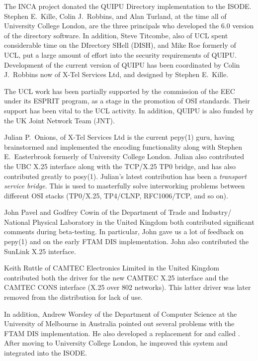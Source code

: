 The INCA project donated the QUIPU Directory implementation to the ISODE.
Stephen E.~Kille,
Colin J.~Robbins,
and Alan Turland,
at the time all of University College London,
are the three principals who developed the 6.0 version of the
directory software.
In addition,
Steve Titcombe,
also of UCL
spent considerable time on the DIrectory SHell (DISH), and 
Mike Roe formerly of UCL,
put a large amount of effort into the security requirements of QUIPU.
Development of the current version of QUIPU has been coordinated by 
Colin J.~Robbins now of X-Tel Services Ltd, and designed by
Stephen E.~Kille.

The UCL work has been partially supported by the commission of the
EEC under its ESPRIT program,
as a stage in the promotion of OSI standards.
Their support has been vital to the UCL activity.
In addition,
QUIPU is also funded by the UK Joint Network Team (JNT).

Julian P.~Onions,
of X-Tel Services Ltd
is the current \man pepy(1) guru,
having brainstormed and implemented the encoding functionality along with
Stephen E.~Easterbrook
formerly of University College London.
Julian also contributed the UBC X.25 interface 
along with the TCP/X.25 TP0 bridge,
and has also contributed greatly to \man posy(1).
Julian's latest contribution has been a {\em transport service bridge}.
This is used to masterfully solve interworking problems between different OSI
stacks (TP0/X.25, TP4/CLNP, RFC1006/TCP, and so on).

John Pavel
and Godfrey Cowin
of the Department of Trade and Industry/ National Physical Laboratory in the
United Kingdom
both contributed significant comments during beta-testing.
In particular, John gave us a lot of feedback on \man pepy(1)
and on the early FTAM DIS implementation.
John also contributed the SunLink X.25 interface.

Keith Ruttle of CAMTEC Electronics Limited in the United
Kingdom contributed both the driver for the new CAMTEC X.25 interface and
the CAMTEC CONS interface (X.25 over 802 networks).
This latter driver was later removed from the distribution for lack of use.

In addition,
Andrew Worsley
of the Department of Computer Science at the University of Melbourne in
Australia
pointed out several problems with the FTAM DIS implementation.
He also developed a replacement for  and  called
.
After moving to University College London,
he improved this system and integrated into the ISODE.

